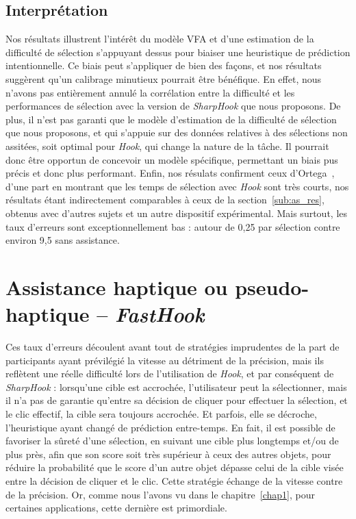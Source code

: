 	\subsection{Interprétation}
	Nos résultats illustrent l'intérêt du modèle VFA et d'une estimation de la difficulté de sélection s'appuyant dessus pour biaiser une heuristique de prédiction intentionnelle. Ce biais peut s'appliquer de bien des façons, et nos résultats suggèrent qu'un calibrage minutieux pourrait être bénéfique. En effet, nous n'avons pas entièrement \og annulé \fg{} la corrélation entre la difficulté et les performances de sélection avec la version de \emph{SharpHook} que nous proposons. De plus, il n'est pas garanti que le modèle d'estimation de la difficulté de sélection que nous proposons, et qui s'appuie sur des données relatives à des sélections non assitées, soit optimal pour \emph{Hook}, qui change la nature de la tâche. Il pourrait donc être opportun de concevoir un modèle spécifique, permettant un biais pus précis et donc plus performant. Enfin, nos résulats confirment ceux d'Ortega~\cite{ortega2013hook}, d'une part en montrant que les temps de sélection avec \emph{Hook} sont très courts, nos résultats étant indirectement comparables à ceux de la section~\ref{sub:as_res}, obtenus avec d'autres sujets et un autre dispositif expérimental. Mais surtout, les taux d'erreurs sont exceptionnellement bas : autour de 0,25 par sélection contre environ 9,5 sans assistance.
	
	\section{Assistance haptique ou pseudo-haptique -- \emph{FastHook}}
	Ces taux d'erreurs découlent avant tout de stratégies \og imprudentes \fg{} de la part de participants ayant prévilégié la vitesse au détriment de la précision, mais ils reflètent une réelle difficulté lors de l'utilisation de \emph{Hook}, et par conséquent de \emph{SharpHook} : lorsqu'une cible est accrochée, l'utilisateur peut la sélectionner, mais il n'a pas de garantie qu'entre sa décision de cliquer pour effectuer la sélection, et le clic effectif, la cible sera toujours accrochée. Et parfois, elle se décroche, l'heuristique ayant changé de prédiction entre-temps. En fait, il est possible de favoriser la \og sûreté \fg{} d'une sélection, en suivant une cible plus longtemps et/ou de plus près, afin que son score soit très supérieur à ceux des autres objets, pour réduire la probabilité que le score d'un autre objet dépasse celui de la cible visée entre la décision de cliquer et le clic. Cette stratégie échange de la vitesse contre de la précision. Or, comme nous l'avons vu dans le chapitre~\ref{chap1}, pour certaines applications, cette dernière est primordiale.
	
